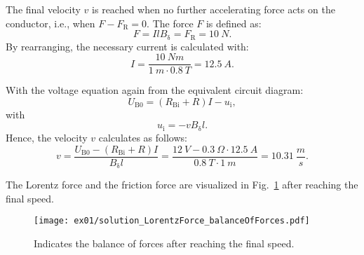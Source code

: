 \begin{solutionblock}
    The final velocity $v$ is reached when no further accelerating force acts on the conductor, i.e., when $F - F_{\mathrm{R}} = 0$. The force $F$ is defined as:
    \begin{equation}
        F = I l B_{\updelta}
        = F_{\mathrm{R}} = 10 \ \si{N}.
    \end{equation}
    By rearranging, the necessary current is calculated with:
    \begin{equation}
        I = \frac{10 \ \si{Nm}}{1 \ \si{m} \cdot 0.8 \ \si{T}}
        = 12.5 \ \si{A}.
    \end{equation}

    With the voltage equation again from the equivalent circuit diagram:
    \begin{equation}
        U_{\mathrm{B0}} = (R_{\mathrm{Bi}}+R)I - u_{\mathrm{i}},
    \end{equation}
    with
    \begin{equation}
        u_{\mathrm{i}} = - v B_{\updelta} l.
    \end{equation}
    Hence, the velocity $v$ calculates as follows:
    \begin{equation}
        v = \frac{U_{\mathrm{B0}}-(R_{\mathrm{Bi}}+R)I}{B_{\updelta} l}
        = \frac{12 \ \si{V} - 0.3 \ \si{\Omega} \cdot 12.5 \ \si{A}}{0.8 \ \si{T} \cdot 1 \ \si{m}}
        = 10.31 \ \frac{\si{m}}{\si{s}}.
    \end{equation}

    The Lorentz force and the friction force are visualized in Fig.~\ref{fig:solution_LorentzForce_balanceOfForces} after reaching the final speed.
    \begin{figure}[ht]
        \centering
        \texttt{[image: ex01/solution\_LorentzForce\_balanceOfForces.pdf]}
        \caption{Indicates the balance of forces after reaching the final speed.}
        \label{fig:solution_LorentzForce_balanceOfForces}
    \end{figure}

\end{solutionblock}





